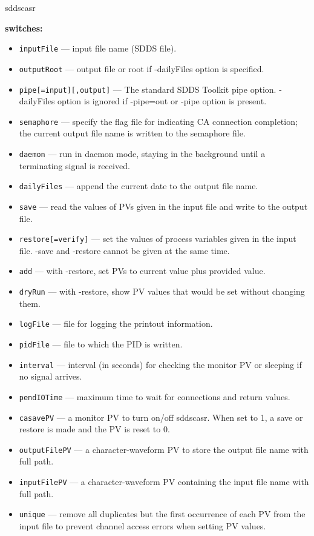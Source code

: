 \begin{sddsprog}{sddscasr}
%
\item {\bf switches:}
%
%
  \begin{itemize}
  \item {\tt inputFile} --- input file name (SDDS file).
  \item {\tt outputRoot} --- output file or root if -dailyFiles option is specified.
  \item {\tt pipe[=input][,output]} --- The standard SDDS Toolkit pipe option.
        -dailyFiles option is ignored if -pipe=out or -pipe option is present.
  \item {\tt semaphore} --- specify the flag file for indicating CA connection completion;
        the current output file name is written to the semaphore file.
  \item {\tt daemon} --- run in daemon mode, staying in the background until a terminating signal is received.
  \item {\tt dailyFiles} --- append the current date to the output file name.
  \item {\tt save} --- read the values of PVs given in the input file and write to the output file.
  \item {\tt restore[=verify]} --- set the values of process variables given in the input file.
        -save and -restore cannot be given at the same time.
  \item {\tt add} --- with -restore, set PVs to current value plus provided value.
  \item {\tt dryRun} --- with -restore, show PV values that would be set without changing them.
  \item {\tt logFile} --- file for logging the printout information.
  \item {\tt pidFile} --- file to which the PID is written.
  \item {\tt interval} --- interval (in seconds) for checking the monitor PV or sleeping if no signal arrives.
  \item {\tt pendIOTime} --- maximum time to wait for connections and return values.
  \item {\tt casavePV} --- a monitor PV to turn on/off sddscasr. When set to 1, a save or restore is made and the PV is reset to 0.
  \item {\tt outputFilePV} --- a character-waveform PV to store the output file name with full path.
  \item {\tt inputFilePV} --- a character-waveform PV containing the input file name with full path.
  \item {\tt unique} --- remove all duplicates but the first occurrence of each PV from the input file to prevent channel access errors when setting PV values.

\end{itemize}
\end{sddsprog}
